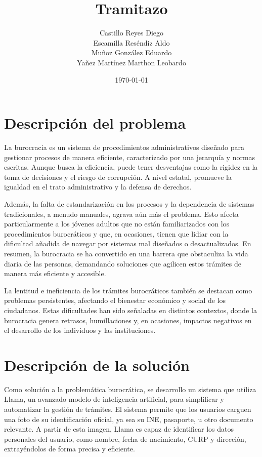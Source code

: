\documentclass[a4paper,12pt]{article}
\title{Tramitazo}
\author{Castillo Reyes Diego\\Escamilla Reséndiz Aldo\\Muñoz González Eduardo\\Yañez Martínez Marthon Leobardo}
\date{\today}
\begin{document}
\maketitle

\newpage

\tableofcontents

\newpage

\section{Descripción del problema}
La burocracia es un sistema de procedimientos administrativos diseñado para gestionar procesos de manera eficiente, caracterizado por una jerarquía y normas escritas. Aunque busca la eficiencia, puede tener desventajas como la rigidez en la toma de decisiones y el riesgo de corrupción. A nivel estatal, promueve la igualdad en el trato administrativo y la defensa de derechos.\cite{ineaf_burocracia}

Además, la falta de estandarización en los procesos y la dependencia de sistemas tradicionales, a menudo manuales, agrava aún más el problema. Esto afecta particularmente a los jóvenes adultos que no están familiarizados con los procedimientos burocráticos y que, en ocasiones, tienen que lidiar con la dificultad añadida de navegar por sistemas mal diseñados o desactualizados. En resumen, la burocracia se ha convertido en una barrera que obstaculiza la vida diaria de las personas, demandando soluciones que agilicen estos trámites de manera más eficiente y accesible.\cite{bid_burocracia}

La lentitud e ineficiencia de los trámites burocráticos también se destacan como problemas persistentes, afectando el bienestar económico y social de los ciudadanos. Estas dificultades han sido señaladas en distintos contextos, donde la burocracia genera retrasos, humillaciones y, en ocasiones, impactos negativos en el desarrollo de los individuos y las instituciones.\cite{economista_burocracia}

\section{Descripción de la solución}
Como solución a la problemática burocrática, se desarrollo un sistema que utiliza Llama, un avanzado modelo de inteligencia artificial, para simplificar y automatizar la gestión de trámites. El sistema permite que los usuarios carguen una foto de su identificación oficial, ya sea su INE, pasaporte, u otro documento relevante. A partir de esta imagen, Llama es capaz de identificar los datos personales del usuario, como nombre, fecha de nacimiento, CURP y dirección, extrayéndolos de forma precisa y eficiente.
\end{document}
